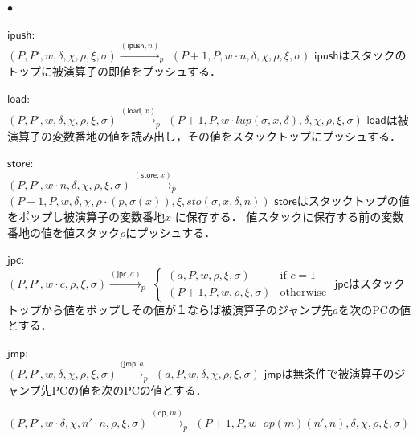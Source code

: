\documentclass[submit,PRO]{ipsj}
\newcommand{\bcode}[1]{$\mathsf{#1}$}
\begin{document}
\begin{list}{$\bullet$}{}
\item \bcode{ipush}:\\
$(P,P',w,\delta,\chi,\rho,\xi,\sigma)\xrightarrow{(\mathsf{ipush},n)}_p$\newline
\qquad$(P+1,P,w\cdot n,\delta,\chi,\rho,\xi,\sigma)$\newline
\bcode{ipush}はスタックのトップに被演算子の即値をプッシュする．
\item \bcode{load}:\\
$(P,P',w,\delta,\chi,\rho,\xi,\sigma)\xrightarrow{(\mathsf{load},x)}_p$\newline
\qquad$(P+1,P,w\cdot lup(\sigma,x,\delta),\delta,\chi,\rho,\xi,\sigma)$\newline
\bcode{load}は被演算子の変数番地の値を読み出し，その値をスタックトップにプッシュする．
\item \bcode{store}:\\
$(P,P',w\cdot n,\delta,\chi,\rho,\xi,\sigma)\xrightarrow{(\mathsf{store},x)}_p$\newline
\qquad$(P+1,P,w,\delta,\chi,\rho\cdot(p,\sigma(x)),\xi,sto(\sigma,x,\delta,n))$\newline
\bcode{store}はスタックトップの値をポップし被演算子の変数番地$x$ に保存する．
値スタックに保存する前の変数番地の値を値スタック$\rho$にプッシュする．
\item  \bcode{jpc}:\\
$(P,P',w\cdot c,\rho,\xi,\sigma)\xrightarrow{(\mathsf{jpc},a)}_p$\newline
\qquad\qquad$\begin{cases}
(a,P,w,\rho,\xi,\sigma) & \mbox{if $c=1$}\\
(P+1,P,w,\rho,\xi,\sigma) & \mbox{otherwise}
\end{cases}$
\newline
\bcode{jpc}はスタックトップから値をポップしその値が１ならば被演算子のジャンプ先$a$を次のPCの値とする． 
\item \bcode{jmp}:\\
$(P,P',w,\delta,\chi,\rho,\xi,\sigma)\xrightarrow{(\mathsf{jmp},a}_p$\newline
\qquad$(a,P,w,\delta,\chi,\rho,\xi,\sigma)$\newline
\bcode{jmp}は無条件で被演算子のジャンプ先PCの値を次のPCの値とする．
\item 
$(P,P',w\cdot \delta,\chi,n'\cdot n,\rho,\xi,\sigma)\xrightarrow{(\mathsf{op},m)}_p$\newline
\qquad $(P+1,P,w\cdot op(m)(n',n),\delta,\chi,\rho,\xi,\sigma)$\newline

\end{list}
\end{document}
